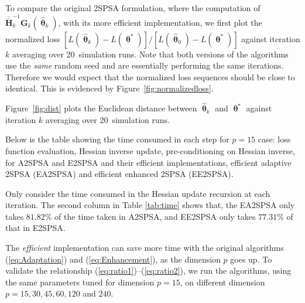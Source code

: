 \documentclass[conference,10.3cpt]{IEEEtran}
\newcommand{\bG}{\bm{G}}
\newcommand{\ooH}{\bm{\overline{\overline{H}}}}
\newcommand{\htheta}{\bm{\hat{\uptheta}}}
\begin{document}
\newcommand{\nruns}[0]{20\ }
To compare the original 2SPSA formulation, where the computation of $\ooH_k^{-1}
\bG_k(\htheta_k)$, with its more efficient
implementation, we first plot the normalized loss
$[L(\htheta_k)-L(\bm{\uptheta}^{*})]/[L(\htheta_0)-L(\bm{\uptheta}^{*})]$
against iteration $k$ averaging over \nruns simulation runs. Note that
both versions of the algorithms use the \textit{same} random seed and
are essentially performing the same iterations. Therefore we would expect
that the normalized loss sequences should be close to identical. This is evidenced by Figure~\ref{fig:normalizedloss}.

Figure~\ref{fig:dist} plots the Euclidean distance between
$\htheta_k$ and $\bm{\uptheta}^{*}$ against iteration $k$ averaging
over \nruns simulation runs.


Below is the table showing the time consumed in each step for $p=15$ case:
loss function evaluation, Hessian inverse update, pre-conditioning on
Hessian inverse, for A2SPSA and E2SPSA and their efficient implementations, efficient adaptive 2SPSA (EA2SPSA) and efficient enhanced 2SPSA (EE2SPSA).

\begin{table}[htbp]
	\centering
		\caption{Time Consumed in Each Procedure for $p=15$}
		\label{tab:time}
	\end{table}

Only consider the time consumed in the Hessian update recursion at each iteration. The second column in Table \ref{tab:time} shows that, the EA2SPSA only takes $81.82\%$ of the time taken in A2SPSA, and EE2SPSA only takes $77.31\%$ of that in E2SPSA.

The \textit{efficient} implementation can save more time with the original algorithms (\ref{eq:Adaptation}) and (\ref{eq:Enhancement}), as the dimension $p$ goes up. To validate the relationship (\ref{eq:ratio1})--(\ref{eq:ratio2}), we run the algorithms, using the same parameters tuned for dimension $p=15$, on different dimension $p=15,30,45,60,120$ and $240$.
\end{document}
